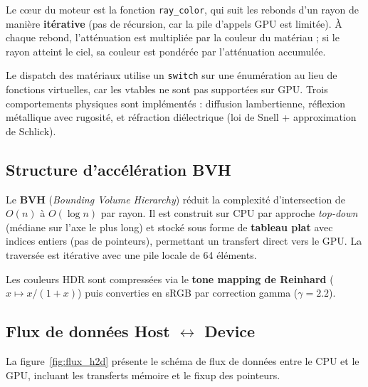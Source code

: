 \documentclass[12pt,a4paper]{article}
\begin{document}
Le c\oe ur du moteur est la fonction \texttt{ray\_color}, qui suit les rebonds d'un rayon de mani\`{e}re \textbf{it\'{e}rative} (pas de r\'{e}cursion, car la pile d'appels GPU est limit\'{e}e). \`{A} chaque rebond, l'att\'{e}nuation est multipli\'{e}e par la couleur du mat\'{e}riau ; si le rayon atteint le ciel, sa couleur est pond\'{e}r\'{e}e par l'att\'{e}nuation accumul\'{e}e.

Le dispatch des mat\'{e}riaux utilise un \texttt{switch} sur une \'{e}num\'{e}ration au lieu de fonctions virtuelles, car les vtables ne sont pas support\'{e}es sur GPU. Trois comportements physiques sont impl\'{e}ment\'{e}s : diffusion lambertienne, r\'{e}flexion m\'{e}tallique avec rugosit\'{e}, et r\'{e}fraction di\'{e}lectrique (loi de Snell + approximation de Schlick).

\subsection{Structure d'acc\'{e}l\'{e}ration BVH}

Le \textbf{BVH} (\textit{Bounding Volume Hierarchy}) r\'{e}duit la complexit\'{e} d'intersection de $O(n)$ \`{a} $O(\log n)$ par rayon. Il est construit sur CPU par approche \textit{top-down} (m\'{e}diane sur l'axe le plus long) et stock\'{e} sous forme de \textbf{tableau plat} avec indices entiers (pas de pointeurs), permettant un transfert direct vers le GPU. La travers\'{e}e est it\'{e}rative avec une pile locale de 64 \'{e}l\'{e}ments.

Les couleurs HDR sont compress\'{e}es via le \textbf{tone mapping de Reinhard} ($x \mapsto x/(1+x)$) puis converties en sRGB par correction gamma ($\gamma = 2.2$).

\subsection{Flux de donn\'{e}es Host $\leftrightarrow$ Device}

La figure~\ref{fig:flux_h2d} pr\'{e}sente le sch\'{e}ma de flux de donn\'{e}es entre le CPU et le GPU, incluant les transferts m\'{e}moire et le fixup des pointeurs.
\end{document}
